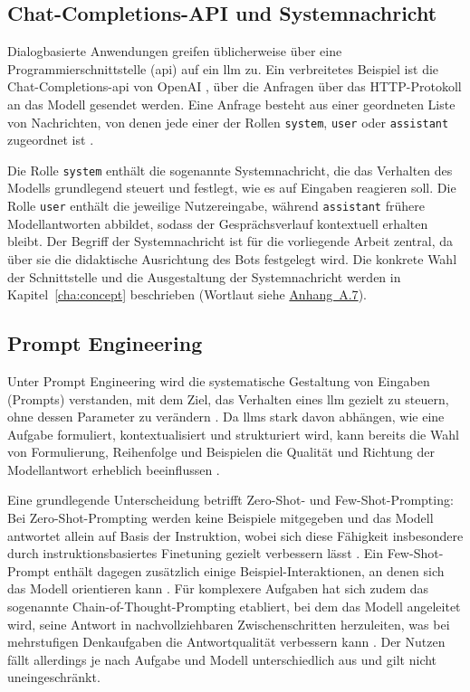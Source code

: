 \subsection{Chat-Completions-API und Systemnachricht}
Dialogbasierte Anwendungen greifen üblicherweise über eine Programmierschnittstelle (\acrshort{api}) auf ein \acrfull{llm} zu. Ein verbreitetes Beispiel ist die Chat-Completions-\acrshort{api} von OpenAI \cite{openaiChatCompletionsAPI2024}, über die Anfragen über das HTTP-Protokoll an das Modell gesendet werden. Eine Anfrage besteht aus einer geordneten Liste von Nachrichten, von denen jede einer der Rollen \texttt{system}, \texttt{user} oder \texttt{assistant} zugeordnet ist \cite{openaiChatCompletionsAPI2024}.

Die Rolle \texttt{system} enthält die sogenannte Systemnachricht, die das Verhalten des Modells grundlegend steuert und festlegt, wie es auf Eingaben reagieren soll. Die Rolle \texttt{user} enthält die jeweilige Nutzereingabe, während \texttt{assistant} frühere Modellantworten abbildet, sodass der Gesprächsverlauf kontextuell erhalten bleibt. Der Begriff der Systemnachricht ist für die vorliegende Arbeit zentral, da über sie die didaktische Ausrichtung des Bots festgelegt wird. Die konkrete Wahl der Schnittstelle und die Ausgestaltung der Systemnachricht werden in Kapitel~\ref{cha:concept} beschrieben (Wortlaut siehe \hyperref[app:systemprompt]{Anhang~A.7}).

\subsection{Prompt Engineering}
Unter Prompt Engineering wird die systematische Gestaltung von Eingaben (Prompts) verstanden,
mit dem Ziel, das Verhalten eines \gls{llm} gezielt zu steuern, ohne dessen Parameter zu verändern
\cite{liuPretrainPromptPredict2021}. Da \glspl{llm} stark davon abhängen, wie eine Aufgabe
formuliert, kontextualisiert und strukturiert wird, kann bereits die Wahl von Formulierung,
Reihenfolge und Beispielen die Qualität und Richtung der Modellantwort erheblich beeinflussen
\cite{sahooSystematicSurveyPrompt2025}.

Eine grundlegende Unterscheidung betrifft Zero-Shot- und Few-Shot-Prompting: Bei
Zero-Shot-Prompting werden keine Beispiele mitgegeben und das Modell antwortet allein auf Basis der
Instruktion, wobei sich diese Fähigkeit insbesondere durch instruktionsbasiertes Finetuning gezielt
verbessern lässt \cite{weiFinetunedLanguageModels2022}. Ein Few-Shot-Prompt enthält dagegen
zusätzlich einige Beispiel-Interaktionen, an denen sich das Modell orientieren kann
\cite{brownLanguageModelsAre2020}. Für komplexere Aufgaben hat
sich zudem das sogenannte Chain-of-Thought-Prompting etabliert, bei dem das Modell angeleitet wird,
seine Antwort in nachvollziehbaren Zwischenschritten herzuleiten, was bei
mehrstufigen Denkaufgaben die Antwortqualität verbessern kann \cite{weiChainofThoughtPrompting2023}.
Der Nutzen fällt allerdings je nach Aufgabe und Modell unterschiedlich aus und gilt nicht
uneingeschränkt.

